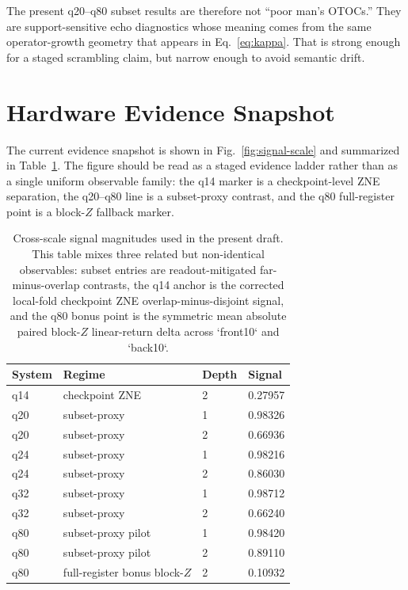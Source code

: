 \documentclass[11pt]{article}
\begin{document}
The present q20--q80 subset results are therefore not ``poor man's OTOCs.''
They are support-sensitive echo diagnostics whose meaning comes from the same operator-growth geometry that appears in Eq.~\eqref{eq:kappa}.
That is strong enough for a staged scrambling claim, but narrow enough to avoid semantic drift.

\section{Hardware Evidence Snapshot}

The current evidence snapshot is shown in Fig.~\ref{fig:signal-scale} and summarized in Table~\ref{tab:signals}.
The figure should be read as a staged evidence ladder rather than as a single uniform observable family:
the q14 marker is a checkpoint-level ZNE separation,
the q20--q80 line is a subset-proxy contrast,
and the q80 full-register point is a block-$Z$ fallback marker.

\begin{table}[t]
\centering
\caption{Cross-scale signal magnitudes used in the present draft. This table mixes three related but non-identical observables: subset entries are readout-mitigated far-minus-overlap contrasts, the q14 anchor is the corrected local-fold checkpoint ZNE overlap-minus-disjoint signal, and the q80 bonus point is the symmetric mean absolute paired block-$Z$ linear-return delta across `front10` and `back10`.}
\label{tab:signals}
\begin{tabular}{@{}llll@{}}
\toprule
System & Regime & Depth & Signal \\
\midrule
q14 & checkpoint ZNE & 2 & 0.27957 \\
q20 & subset-proxy & 1 & 0.98326 \\
q20 & subset-proxy & 2 & 0.66936 \\
q24 & subset-proxy & 1 & 0.98216 \\
q24 & subset-proxy & 2 & 0.86030 \\
q32 & subset-proxy & 1 & 0.98712 \\
q32 & subset-proxy & 2 & 0.66240 \\
q80 & subset-proxy pilot & 1 & 0.98420 \\
q80 & subset-proxy pilot & 2 & 0.89110 \\
q80 & full-register bonus block-$Z$ & 2 & 0.10932 \\
\bottomrule
\end{tabular}
\end{table}
\end{document}
